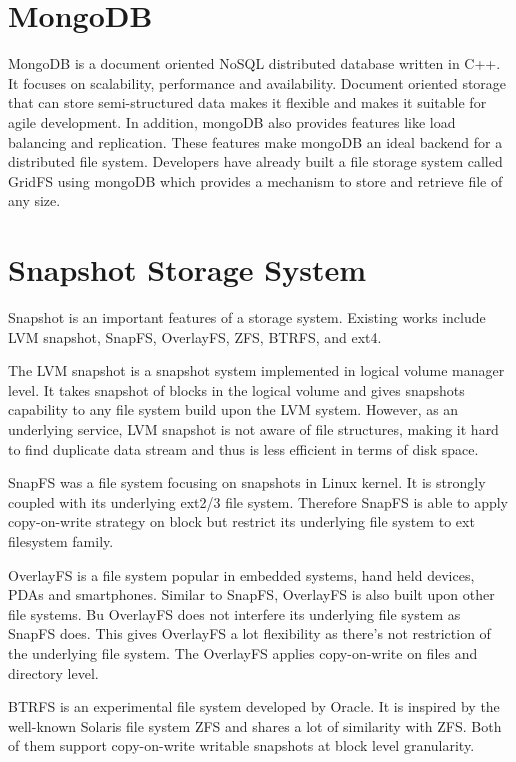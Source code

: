 \section{MongoDB}

    MongoDB is a document oriented NoSQL distributed database written in C++. It focuses on scalability, performance and availability. Document oriented storage that can store semi-structured data makes it flexible and makes it suitable for agile development. In addition, mongoDB also provides features like load balancing and replication. These features make mongoDB an ideal backend for a distributed file system. Developers have already built a file storage system called GridFS using mongoDB which provides a mechanism to store and retrieve file of any size.

\section{Snapshot Storage System}

    Snapshot is an important features of a storage system. Existing works include LVM snapshot, SnapFS, OverlayFS, ZFS, BTRFS, and ext4.
    
    The LVM snapshot is a snapshot system implemented in logical volume manager level. It takes snapshot of blocks in the logical volume and gives snapshots capability to any file system build upon the LVM system. However, as an underlying service, LVM snapshot is not aware of file structures, making it hard to find duplicate data stream and thus is less efficient in terms of disk space.
    
    SnapFS was a file system focusing on snapshots in Linux kernel. It is strongly coupled with its underlying ext2/3 file system. Therefore SnapFS is able to apply copy-on-write strategy on block but restrict its underlying file system to ext filesystem family. 
    
    OverlayFS is a file system popular in embedded systems, hand held devices, PDAs and smartphones. Similar to SnapFS, OverlayFS is also built upon other file systems. Bu OverlayFS does not interfere its underlying file system as SnapFS does. This gives OverlayFS a lot flexibility as there's not restriction of the underlying file system. The OverlayFS applies copy-on-write on files and directory level.

    BTRFS is an experimental file system developed by Oracle. It is inspired by the well-known Solaris file system ZFS and shares a lot of similarity with ZFS. Both of them support copy-on-write writable snapshots at block level granularity.
    

